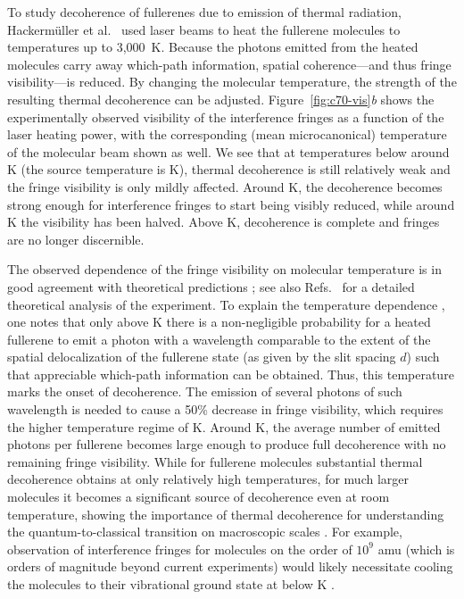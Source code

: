\documentclass[3p,sort&compress]{elsarticle}
\begin{document}
To study decoherence of fullerenes due to emission of thermal radiation, Hackerm\"uller et al.\ \cite{Hackermuller:2004:rd} used laser beams to heat the fullerene molecules to temperatures up to 3,000~K. Because the photons emitted from the heated molecules  carry away which-path information, spatial coherence---and thus fringe visibility---is reduced. By changing the molecular temperature, the strength of the resulting thermal decoherence can be adjusted. Figure~\ref{fig:c70-vis}\emph{b} shows the experimentally observed visibility of the interference fringes as a function of the laser heating power, with the corresponding (mean microcanonical) temperature of the molecular beam shown as well. We see that at temperatures below around \unit[1,500]{K} (the source temperature is \unit[900]{K}), thermal decoherence is still relatively weak and the fringe visibility is only mildly affected. Around \unit[2,000]{K}, the decoherence becomes strong enough for interference fringes to start being visibly reduced, while around \unit[2,500]{K} the visibility has been halved. Above \unit[3,000]{K}, decoherence is complete and fringes are no longer discernible. 

The observed dependence of the fringe visibility on molecular temperature is in good agreement with theoretical predictions \cite{Hackermuller:2004:rd}; see also Refs.~\cite{Hornberger:2005:mo,Hornberger:2006:tx} for a detailed theoretical analysis of the experiment. To explain the temperature dependence \cite{Hornberger:2005:mo}, one notes that only above \unit[2,000]{K} there is a non-negligible probability for a heated fullerene to emit a photon with a wavelength comparable to the extent of the spatial delocalization of the fullerene state (as given by the slit spacing $d$) such that appreciable which-path information can be obtained. Thus, this temperature marks the onset of decoherence. The emission of several photons of such wavelength is needed to cause a 50\% decrease in fringe visibility, which requires the higher temperature regime of \unit[2,500]{K}. Around \unit[3,000]{K}, the average number of emitted photons per fullerene becomes large enough to produce full decoherence with no remaining fringe visibility. While for fullerene molecules substantial thermal decoherence obtains at only relatively high temperatures, for much larger molecules it becomes a significant source of decoherence even at room temperature, showing the importance of thermal decoherence for understanding the quantum-to-classical transition on macroscopic scales \cite{Joos:2003:jh,Hornberger:2006:tx,Schlosshauer:2007:un}. For example, observation of interference fringes for molecules on the order of $10^9$ amu (which is orders of magnitude beyond current experiments) would likely necessitate cooling the molecules to their vibrational ground state at below \unit[77]{K} \cite{Hornberger:2012:ii, Kaltenbaek:2016:pp}. 
\end{document}
